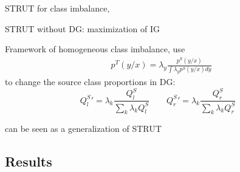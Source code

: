 \begin{frame}{STRUT for class imbalance}{\strutnd, \struthi}

    \begin{tcolorbox}[title=\strutnd,size=title,boxrule=0.2pt]
    STRUT without DG: maximization of IG
    \end{tcolorbox}
    \pause
    \begin{tcolorbox}[title=\struthi,size=title,boxrule=0.2pt]
    Framework of homogeneous class imbalance, use
    \begin{align*}
        & p^T(y/x) = \lambda_y \frac{p^S(y/x)}{\int{\lambda_y p^S(y/x)dy}} \tag{2}
    \end{align*}
    to change the source class proportions in DG:
    \begin{equation*}
    {Q_l^S} ' = \lambda_k\frac{ Q_l^S}{\sum \limits_{k}{ \lambda_{k}Q_l^S}} \quad \quad
    {Q_r^S} ' = \lambda_k\frac{ Q_r^S}{\sum \limits_{k}{ \lambda_{k}Q_r^S}} 
    \label{probcond}
    \end{equation*}
    \end{tcolorbox}
    \pause
    \centering \textcolor{myorange}{\struthi} can be seen as a generalization of STRUT
 
\end{frame}

\subsection{Results}

